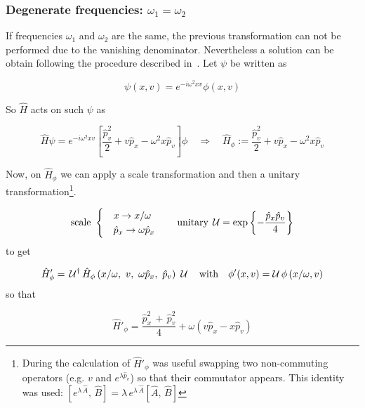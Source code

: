 \subsubsection{Degenerate frequencies: $\omega_1 = \omega_2$}
If frequencies $\omega_1$ and $\omega_2$ are the same, the previous
transformation can not be performed due to the vanishing denominator.
Nevertheless a solution can be obtain following the procedure described
in~\cite{PU50, Bolonek06}. Let $\psi$ be written as

\begin{equation*}
  \psi(x, v) = e^{-i\omega^2xv}\phi(x,v)
\end{equation*}

So $\hat{H}$ acts on such $\psi$ as

\begin{equation*}
  \hat{H} \psi = e^{-i\omega^2xv}
  \left[\frac{\hat{p}_v^2}{2} + v\hat{p}_x - \omega^2x\hat{p}_v \right] \phi
  \quad \Rightarrow \quad
  \hat{H}_{\phi} :=
  \frac{\hat{p}_v^2}{2} + v\hat{p}_x - \omega^2x\hat{p}_v
\end{equation*}

Now, on $\hat{H}_{\phi}$ we can apply a scale transformation and then a unitary
transformation\footnote{
  During the calculation of $\hat{H}'_{\phi}$ was useful swapping
  two non-commuting operators (e.g. $v$ and $e^{\lambda \hat{p}_v}$)
  so that their commutator appears. This identity was used:
  $\left[e^{\lambda \, \hat{A}}, \, \hat{B}\right] =
  \lambda \, e^{\lambda \, \hat{A}} \left[\hat{A} , \, \hat{B} \right]$
}.

\begin{equation*}
  \text{scale} \
  \begin{cases}
    &x         \rightarrow x/\omega \\
    &\hat{p}_x \rightarrow \omega\hat{p}_x
  \end{cases}
  \qquad \text{unitary} \;
  \operatorname{\mathcal{U}} = \exp\left\{ - \frac{\hat{p}_x \hat{p}_v}{4}\right\}
\end{equation*}
to get

\begin{equation*}
  \hat{H}'_{\phi} = \, \U^{\dagger}
  \hat{H}_{\phi} \left(x/\omega,\ v,\ \omega \hat{p}_x,\ \hat{p}_v\right) \ \U
  \quad \text{with} \quad
  \phi'(x, v) = \U \phi\left(x/\omega, v\right)
\end{equation*}
so that

\begin{equation} \label{eq:ham_phi_PU}
  \hat{H}'_{\phi} = \frac{\hat{p}^2_x \, + \, \hat{p}^2_{v}}{4}
  + \omega \left(v \hat{p}_x - x \hat{p}_v \right)
\end{equation}

